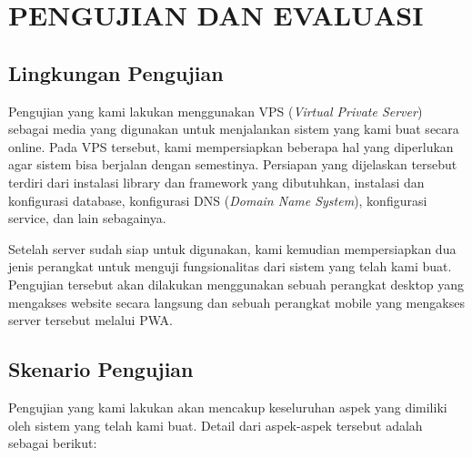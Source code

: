 \chapter{PENGUJIAN DAN EVALUASI}
\vspace{4ex}

\setlength{\parindent}{7ex}


\section{Lingkungan Pengujian}
\vspace{1ex}

Pengujian yang kami lakukan menggunakan VPS (\emph{Virtual Private Server}) sebagai media yang digunakan untuk menjalankan sistem yang kami buat secara online.
Pada VPS tersebut, kami mempersiapkan beberapa hal yang diperlukan agar sistem bisa berjalan dengan semestinya.
Persiapan yang dijelaskan tersebut terdiri dari instalasi library dan framework yang dibutuhkan, instalasi dan konfigurasi database, konfigurasi DNS (\emph{Domain Name System}), konfigurasi service, dan lain sebagainya.
\vspace{0.5ex}

Setelah server sudah siap untuk digunakan, kami kemudian mempersiapkan dua jenis perangkat untuk menguji fungsionalitas dari sistem yang telah kami buat.
Pengujian tersebut akan dilakukan menggunakan sebuah perangkat desktop yang mengakses website secara langsung dan sebuah perangkat mobile yang mengakses server tersebut melalui PWA.
\vspace{0.5ex}

\section{Skenario Pengujian}
\vspace{1ex}

Pengujian yang kami lakukan akan mencakup keseluruhan aspek yang dimiliki oleh sistem yang telah kami buat.
Detail dari aspek-aspek tersebut adalah sebagai berikut:
\vspace{0.5ex}

